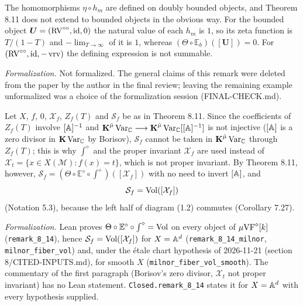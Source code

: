 \setcounter{theorem}{12}
\begin{remark}
\label{sec-hm-bounded}
The homomorphisms $\eta \circ h_m$ are defined on doubly bounded objects, and Theorem 8.11 does not extend to bounded objects in the obvious way. For the bounded object $\boldsymbol{U} = (\mathrm{RV}^{\circ\circ}, \mathrm{id}, 0)$ the natural value of each $h_m$ is $1$, so its zeta function is $T/(1-T)$ and $-\lim_{T \to \infty}$ of it is $1$, whereas $(\Theta \circ \mathbb{E}_b)([\bm U]) = 0$. For $(\mathrm{RV}^{\circ\circ}, \mathrm{id}, -\operatorname{vrv})$ the defining expression is not summable.

\emph{Formalization.} Not formalized. The general claims of this remark were deleted from the paper by the author in the final review; leaving the remaining example unformalized was a choice of the formalization session (FINAL-CHECK.md).
\end{remark}

\setcounter{theorem}{13}
\begin{remark}
\label{rem-comp-milnor-fib}
\leanok
{}
Let $X$, $f$, $0$, $\mathcal X_f$, $Z_f(T)$ and $\mathcal S_f$ be as in Theorem 8.11. Since the coefficients of $Z_f(T)$ involve $[\mathbb{A}]^{-1}$ and $\operatorname{\mathbf{K}}^{\hat\mu}\mathrm{Var}_{\mathbb{C}} \longrightarrow \operatorname{\mathbf{K}}^{\hat\mu}\mathrm{Var}_{\mathbb{C}}[[\mathbb{A}]^{-1}]$ is not injective ($[\mathbb{A}]$ is a zero divisor in $\operatorname{\mathbf{K}} \mathrm{Var}_{\mathbb{C}}$ by Borisov), $\mathcal S_f$ cannot be taken in $\operatorname{\mathbf{K}}^{\hat\mu}\mathrm{Var}_{\mathbb{C}}$ through $Z_f(T)$; this is why $\int^\diamond$ and the proper invariant $\mathcal X_f$ are used instead of $\mathcal X_t = \{x \in X(\mathcal M) : f(x) = t\}$, which is not proper invariant. By Theorem 8.11, however, $\mathcal S_f = (\Theta \circ \mathbb E^\diamond \circ \int^\diamond)([\mathcal X_f])$ with no need to invert $[\mathbb{A}]$, and \[ \mathcal S_f = \operatorname{Vol}([\mathcal X_f]) \] (Notation 5.3), because the left half of diagram (1.2) commutes (Corollary 7.27).

\emph{Formalization.} Lean proves $\Theta \circ \mathbb E^\diamond \circ \int^\diamond = \operatorname{Vol}$ on every object of $\mu\mathrm{VF}^\diamond[k]$ (\texttt{remark\_8\_14}), hence $\mathcal S_f = \operatorname{Vol}([\mathcal X_f])$ for $X = \mathbb{A}^d$ (\texttt{remark\_8\_14\_milnor}, \texttt{milnor\_fiber\_vol}) and, under the \'etale chart hypothesis of 2026-11-21 (section 8/CITED-INPUTS.md), for smooth $X$ (\texttt{milnor\_fiber\_vol\_smooth}). The commentary of the first paragraph (Borisov's zero divisor, $\mathcal X_t$ not proper invariant) has no Lean statement. \texttt{Closed.remark\_8\_14} states it for $X = \mathbb{A}^d$ with every hypothesis supplied.
\end{remark}

